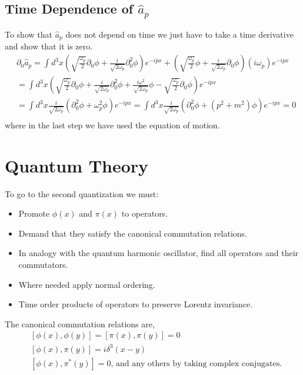 \documentclass{article}
\numberwithin{equation}{section}
\newcommand{\beq}{\begin{equation}}
\newcommand{\eeq}{\end{equation}}
\begin{document}
\subsection{Time Dependence of $\hat{a}_p$}
To show that $\hat{a}_p$ does not depend on time we just have to take a time derivative and show that it is zero.
\beq \begin{split}
    & \partial_0 \hat{a}_p = \int d^3x \left( \sqrt{\frac{\omega_p}{2}} \partial_0 \phi+\frac{i}{\sqrt{2\omega_p}}\partial^2_0 \phi \right) e^{-ipx}+ \left(\sqrt{\frac{\omega_p}{2}} \phi+\frac{i}{\sqrt{2\omega_p}}\partial_0 \phi \right)(i\omega_p) e^{-ipx} \\
    &= \int d^3x\left(\sqrt{\frac{\omega_p}{2}} \partial_0 \phi+\frac{i}{\sqrt{2\omega_p}}\partial^2_0 \phi +\frac{i\omega^2}{\sqrt{2\omega_p}}\phi -\sqrt{\frac{\omega_p}{2}}\partial_0 \phi \right) e^{-ipx} \\
    &= \int d^3x\frac{i}{\sqrt{2\omega_p}} \left(\partial^2_0 \phi + \omega^2_p \phi \right) e^{-ipx}=\int d^3x\frac{i}{\sqrt{2\omega_p}} \left(\partial^2_0 \phi + (p^2+m^2) \phi \right) e^{-ipx} = 0 \\
\end{split} \eeq
where in the last step we have used the equation of motion.

\section{Quantum Theory}
To go to the second quantization we must:
\begin{itemize}
    \item Promote $\phi(x)$ and $\pi(x)$ to operators.
    \item Demand that they satisfy the canonical commutation relations.
    \item In analogy with the quantum harmonic oscillator, find all operators and their commutators.
    \item Where needed apply normal ordering.
    \item Time order products of operators to preserve Lorentz invariance.
\end{itemize}
The canonical commutation relations are,
\beq \label{comm} \begin{split}
    &[\phi(x),\phi(y)] = [\pi(x),\pi(y)] = 0  \\
    &[\phi(x), \pi(y)] = i\delta^3(x-y)  \\
    &[\phi(x), \pi^*(y)] = 0 \text{, and any others by taking complex conjugates.}
\end{split} \eeq
\end{document}

